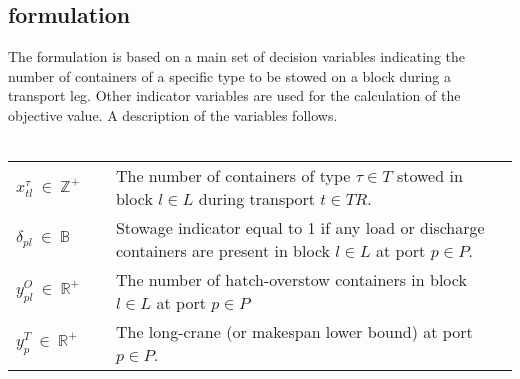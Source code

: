 \documentclass[preprint,12pt,authoryear]{elsarticle}
\begin{document}
\subsection{\cite{Pacino2011FastVessels} formulation}
The formulation is based on a main set of decision variables indicating the number of containers of a specific type to be stowed on a block during a transport leg. Other indicator variables are used for the calculation of the objective value. A description of the variables follows.
\\\\
\begin{tabularx}{\linewidth}{lX}
     $x^\tau_{tl}~\in~\mathbb{Z}^+~\quad $ & The number of containers of type $\tau \in T$ stowed in block $l\in L$ during transport $t \in TR$.\\
     $\delta_{pl}~\in~\mathbb{B}~\quad $ & Stowage indicator equal to 1 if any load or discharge containers are present in block $l \in L$ at port $p\in P$.\\
     $y^O_{pl}~\in~\mathbb{R}^+$ & The number of hatch-overstow containers in block $l\in L$ at port $p\in P$\\
     $y^T_p~\in~\mathbb{R}^+$ & The long-crane (or makespan lower bound) at port $p\in P$.\\
\end{tabularx}
\\\\
\end{document}
